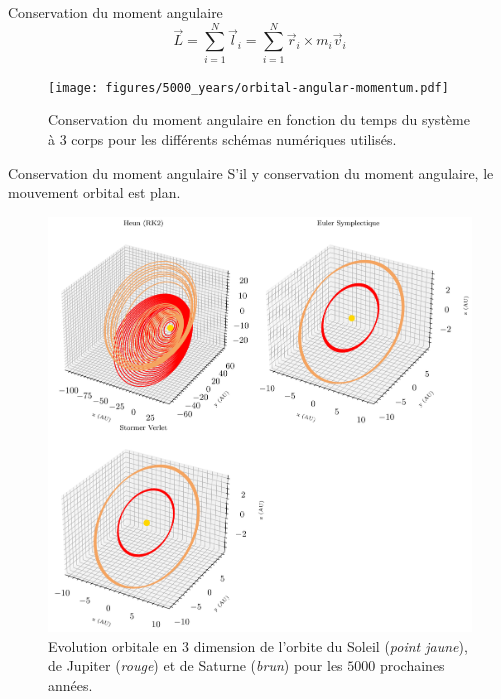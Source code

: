 \documentclass[10pt]{beamer}
\begin{document}
\begin{frame}{Conservation du moment angulaire}
  \begin{equation}
    \vec{L} = \sum_{i=1}^N \vec{l}_i = \sum_{i=1}^N \vec{r}_i \times m_i \vec{v}_i
  \end{equation}
  \begin{figure}
    \centering
    \texttt{[image: figures/5000\_years/orbital-angular-momentum.pdf]}
    \caption{Conservation du moment angulaire en fonction du temps du système à 3 corps pour les différents schémas numériques utilisés.}
    \label{fig:orbital-angular-momentum}
  \end{figure}
\end{frame}

\begin{frame}{Conservation du moment angulaire}
  S'il y conservation du moment angulaire, le mouvement orbital est plan.
  \begin{figure}
    \centering
    \includegraphics[width=\textwidth,height=0.5\textheight,keepaspectratio]{figures/5000_years/orbital-plot3d.png}
    \caption{Evolution orbitale en $3$ dimension de l'orbite du Soleil (\emph{point jaune}), de Jupiter (\emph{rouge}) et de Saturne (\emph{brun}) pour les $5000$ prochaines années.}
    \label{fig:orbital-plot3D--5000}
  \end{figure}
\end{frame}
\end{document}
